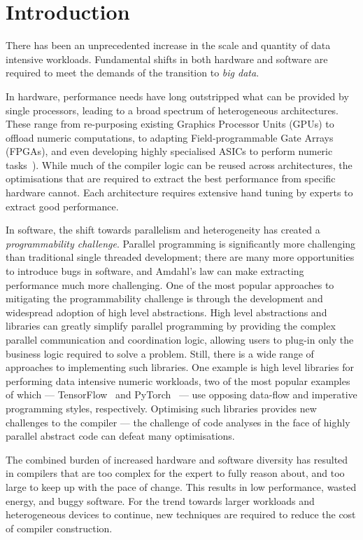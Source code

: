 \chapter{Introduction}

There has been an unprecedented increase in the scale and quantity of data intensive workloads. Fundamental shifts in both hardware and software are required to meet the demands of the transition to \emph{big data}.

In hardware, performance needs have long outstripped what can be provided by single processors, leading to a broad spectrum of heterogeneous architectures. These range from re-purposing existing Graphics Processor Units (GPUs) to offload numeric computations, to adapting Field-programmable Gate Arrays (FPGAs), and even developing highly specialised ASICs to perform numeric tasks~\cite{Misra2010,Jouppi2017}). While much of the compiler logic can be reused across architectures, the optimisations that are required to extract the best performance from specific hardware cannot. Each architecture requires extensive hand tuning by experts to extract good performance.

In software, the shift towards parallelism and heterogeneity has created a \emph{programmability challenge}. Parallel programming is significantly more challenging than traditional single threaded development; there are many more opportunities to introduce bugs in software, and Amdahl's law can make extracting performance much more challenging. One of the most popular approaches to mitigating the programmability challenge is through the development and widespread adoption of high level abstractions. High level abstractions and libraries can greatly simplify parallel programming by providing the complex parallel communication and coordination logic, allowing users to plug-in only the business logic required to solve a problem. Still, there is a wide range of approaches to implementing such libraries. One example is high level libraries for performing data intensive numeric workloads, two of the most popular examples of which --- TensorFlow~\cite{Abadi} and PyTorch~\cite{Paszke2017} --- use opposing data-flow and imperative programming styles, respectively. Optimising such libraries provides new challenges to the compiler --- the challenge of code analyses in the face of highly parallel abstract code can defeat many optimisations.

The combined burden of increased hardware and software diversity has resulted in compilers that are too complex for the expert to fully reason about, and too large to keep up with the pace of change. This results in low performance, wasted energy, and buggy software. For the trend towards larger workloads and heterogeneous devices to continue, new techniques are required to reduce the cost of compiler construction.


